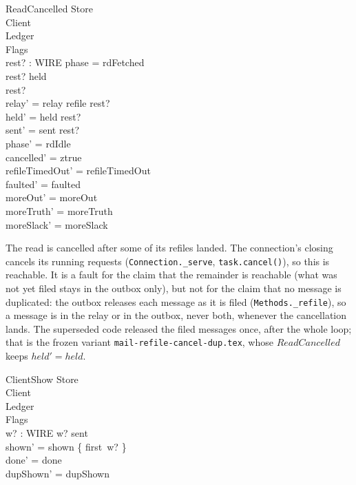 \documentclass[a4paper,10pt,fleqn]{article}
\begin{document}
\begin{schema}{ReadCancelled}
  \Delta Store \\
  \Xi Client \\
  \Xi Ledger \\
  \Delta Flags \\
  rest? : \power WIRE
  \where
  phase = rdFetched \\
  rest? \subseteq held \\
  rest? \neq \emptyset \\
  relay' = relay \cup refile \limg rest? \rimg \\
  held' = held \setminus rest? \\
  sent' = sent \setminus rest? \\
  phase' = rdIdle \\
  cancelled' = ztrue \\
  refileTimedOut' = refileTimedOut \\
  faulted' = faulted \\
  moreOut' = moreOut \\
  moreTruth' = moreTruth \\
  moreSlack' = moreSlack
\end{schema}

The read is cancelled after some of its refiles landed.  The connection's
closing cancels its running requests (\texttt{Connection.\_serve},
\texttt{task.cancel()}), so this is reachable.  It is a fault for the claim that
the remainder is reachable (what was not yet filed stays in the outbox only),
but not for the claim that no message is duplicated: the outbox releases each
message as it is filed (\texttt{Methods.\_refile}), so a message is in the
relay or in the outbox, never both, whenever the cancellation lands.  The superseded code released the filed messages once,
after the whole loop; that is the frozen variant
\texttt{mail-refile-cancel-dup.tex}, whose $ReadCancelled$ keeps $held' =
held$.

\begin{schema}{ClientShow}
  \Xi Store \\
  \Delta Client \\
  \Xi Ledger \\
  \Xi Flags \\
  w? : WIRE
  \where
  w? \in sent \\
  shown' = shown \cup \{ first~w? \} \\
  done' = done \\
  dupShown' = dupShown
\end{schema}
\end{document}

